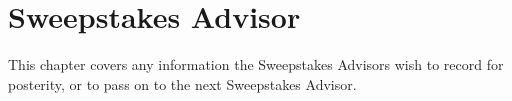 \chapter{Sweepstakes Advisor}
This chapter covers any information the Sweepstakes Advisors wish to record
for posterity, or to pass on to the next Sweepstakes Advisor.
